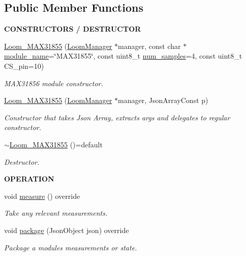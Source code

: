 \subsection*{Public Member Functions}
\begin{Indent}{\bf C\+O\+N\+S\+T\+R\+U\+C\+T\+O\+RS / D\+E\+S\+T\+R\+U\+C\+T\+OR}\par
\begin{DoxyCompactItemize}
\item 
\hyperlink{class_loom___m_a_x31855_a8e8c4207f3e47e0344e7b700bea51092}{Loom\+\_\+\+M\+A\+X31855} (\hyperlink{class_loom_manager}{Loom\+Manager} $\ast$manager, const char $\ast$\hyperlink{class_loom_module_adf6e68ad7e9fa2acfca7a8a280680764}{module\+\_\+name}=\char`\"{}M\+A\+X31855\char`\"{}, const uint8\+\_\+t \hyperlink{class_loom_sensor_a0e74ebbaecde15ed1c71e1bb6bc6aebe}{num\+\_\+samples}=4, const uint8\+\_\+t C\+S\+\_\+pin=10)
\begin{DoxyCompactList}\small\item\em M\+A\+X31856 module constructor. \end{DoxyCompactList}\item 
\hyperlink{class_loom___m_a_x31855_aee3b25b9d70d51abd50add93fb49441e}{Loom\+\_\+\+M\+A\+X31855} (\hyperlink{class_loom_manager}{Loom\+Manager} $\ast$manager, Json\+Array\+Const p)
\begin{DoxyCompactList}\small\item\em Constructor that takes Json Array, extracts args and delegates to regular constructor. \end{DoxyCompactList}\item 
\hyperlink{class_loom___m_a_x31855_ab01cad500c01e090e173f94dfe38f2f3}{$\sim$\+Loom\+\_\+\+M\+A\+X31855} ()=default
\begin{DoxyCompactList}\small\item\em Destructor. \end{DoxyCompactList}\end{DoxyCompactItemize}
\end{Indent}
\begin{Indent}{\bf O\+P\+E\+R\+A\+T\+I\+ON}\par
\begin{DoxyCompactItemize}
\item 
void \hyperlink{class_loom___m_a_x31855_a51f226ce0e210a341cf6c46bebe4e5df}{measure} () override
\begin{DoxyCompactList}\small\item\em Take any relevant measurements. \end{DoxyCompactList}\item 
void \hyperlink{class_loom___m_a_x31855_ab810ae8d4b02cb1a7326669f359bb56b}{package} (Json\+Object json) override
\begin{DoxyCompactList}\small\item\em Package a modules measurements or state. \end{DoxyCompactList}\end{DoxyCompactItemize}
\end{Indent}
